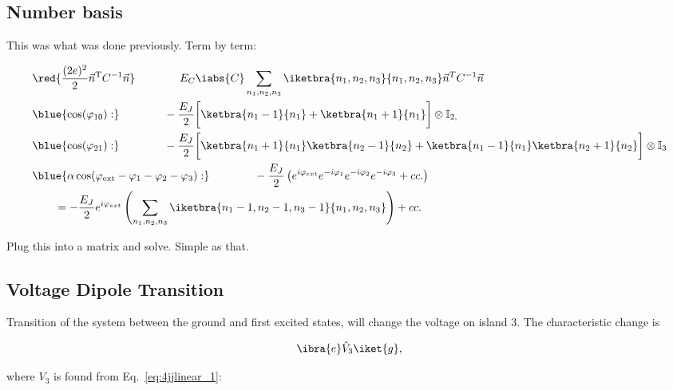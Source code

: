 \subsection{Number basis}
\label{sec:number-basis}

This was what was done previously. Term by term:

\begin{equation}
  \label{eq:4jjlinear_3}
  \begin{aligned}
    &\red{\frac{(2e)^2}{2}\vec{n}^{\text{T}}C^{-1}\vec{n}}\qquad\qquad E_C \iabs{C} \sum_{n_{1},n_{2},n_3}\iketbra{n_{1},n_2,n_3}{n_{1},n_2,n_3}\vec{n}^TC^{-1}\vec{n}\\
    & \blue{\cos(\varphi_{10}):}\qquad\qquad -\frac{E_J}{2}\bigg[\ketbra{n_1-1}{n_1}+\ketbra{n_1+1}{n_1}\bigg]\otimes \mathbb{I}_{2,}\\
    & \blue{\cos(\varphi_{21}):}\qquad\qquad - \frac{E_J}{2}\bigg[\ketbra{n_1+1}{n_1}\ketbra{n_2-1}{n_2}+\ketbra{n_1-1}{n_1}\ketbra{n_2+1}{n_2}\bigg]\otimes\mathbb{I}_3\\
    & \blue{\alpha\cos(\varphi_\text{ext}-\varphi_{1} - \varphi_{2} - \varphi_{3}):}\qquad\qquad -\frac{E_J}{2}\left(e^{i\varphi_{ext}}e^{-i\varphi_{1}}e^{-i\varphi_2}e^{-i\varphi_{3}} + cc.\right)\\
    &      \qquad       =      -\frac{E_{J}}{2}       e^{i\varphi_{ext}}      \left(\sum_{n_{1},n_{2},n_{3}}
      \iketbra{n_{1}-1,n_{2}-1,n_{3}-1}{n_1,n_2,n_{3}}\right) + cc.
  \end{aligned}
\end{equation}

\noindent Plug this into a matrix and solve. Simple as that.


\subsection{Voltage Dipole Transition}
\label{sec:volt-dipole-trans}

Transition of the system between the ground  and first excited states, will change the voltage
on island 3. The characteristic change is

\begin{equation}
  \label{eq:4jjlinear_3}
  \ibra{e}\hat{V}_3 \iket{g},
\end{equation}

\noindent where $ V_{3} $ is found from Eq.~\ref{eq:4jjlinear_1}:

